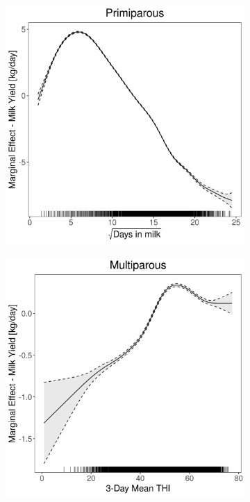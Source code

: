 \begin{figure}[H]
\begin{subfigure}[b]{0.45\textwidth}
    \end{subfigure}
    \hspace{0.05\textwidth} %
    \begin{subfigure}[b]{0.45\textwidth}
        \centering
        \includegraphics[width=\textwidth]{thesis/figures/models/milk/after2010/sf_milk_after2010/sf_milk_after2010_marginal_dim_milk_primi.png}
    \end{subfigure}
    \begin{subfigure}[b]{0.45\textwidth}
        \centering
        \includegraphics[width=\textwidth]{thesis/figures/models/milk/after2010/sf_milk_after2010/sf_milk_after2010_marginal_thi_milk_multi.png}

\end{subfigure}
\end{figure}
